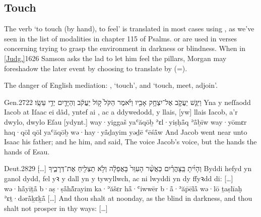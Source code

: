 \subsection{Touch}


\begin{paper}
	{\click} The verb  ‘to touch (by hand), to feel’ is translated in most cases using , as we’ve seen in the list of modalities in chapter 115 of Psalms.  or  are used in verses concerning trying to grasp the environment in darkness or blindness. When in \vref{Judg.}{16}{26}{} Samson asks the lad to let him feel the pillars, Morgan may foreshadow the later event by choosing to translate  by  (=).

	\begin{leftbar}
		\begin{compactitem}
			\item The danger of English mediation: , ‘touch’, and  ‘touch, meet, adjoin’.
		\end{compactitem}
	\end{leftbar}
\end{paper}

\begin{example}{Gen.}{27}{22}{}{}
	\quoling
	{וַיִּגַּ֧שׁ יַעֲקֹ֛ב אֶל־יִצְחָ֥ק אָבִ֖יו  וַיֹּ֗אמֶר הַקֹּל֙ ק֣וֹל יַעֲקֹ֔ב וְהַיָּדַ֖יִם יְדֵ֥י עֵשָֽׂו׃}
	{Yna y neſſaodd Iacob at Iſaac ei dâd, yntef ai , ac a ddywedodd, y llais, [yw] llais Iacob, a’r dwylo, dwylo Eſau [ydynt.]}
	{way·yiggaš yaʿăqōḇ ʾɛl·yiṣḥå̄q ʾå̄ḇīw  way·yōmɛr haq·qōl qōl yaʿăqōḇ wə·hay·yå̄ḏayim yəḏē ʿēśå̄w}
	{And Jacob went near unto Isaac his father; and he  him, and said, The voice  Jacob’s voice, but the hands  the hands of Esau.}
\end{example}

\begin{example}{Deut.}{28}{29}{}{}
	\quoling
	{וְהָיִ֜יתָ  בַּֽצָּהֳרַ֗יִם כַּאֲשֶׁ֨ר  הָעִוֵּר֙ בָּאֲפֵלָ֔ה וְלֹ֥א תַצְלִ֖יחַ אֶת־דְּרָכֶ֑יךָ […]׃}
	{Byddi hefyd yn  ganol dydd, fel yꝛ  y dall yn y tywyllwch, ac ni lwyddi yn dy ffyꝛdd di: […]}
	{wə·hå̄yīṯå̄  b·aṣ·ṣå̄hå̄̆rayim ka·ʾăšɛr  hå̄·ʿiwwēr b·å̄·ʾăp̄ēlå̄ wə·lō ṯaṣlīaḥ ʾɛṯ·dərå̄ḵɛḵå̄ […]}
	{And thou shalt  at noonday, as the blind  in darkness, and thou shalt not prosper in thy ways: […]}
\end{example}

